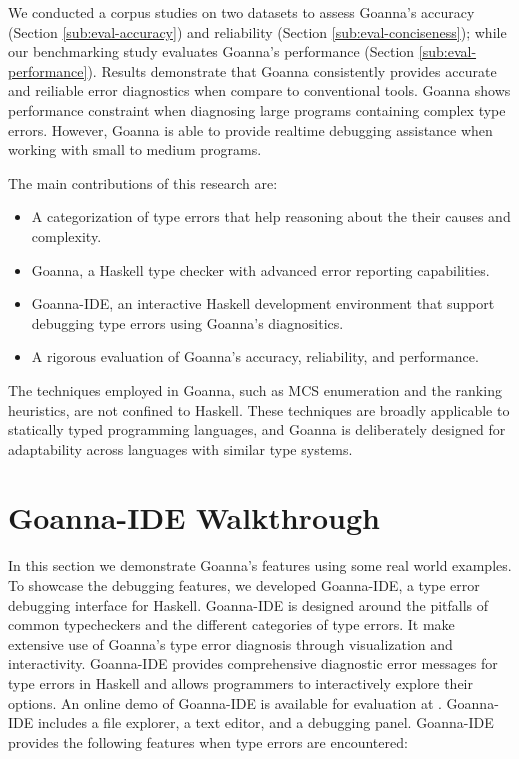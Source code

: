 \documentclass[pdflatex,sn-mathphys-num]{sn-jnl}%
\begin{document}
We conducted a corpus studies on two datasets to assess Goanna's accuracy (Section \ref{sub:eval-accuracy}) and reliability (Section \ref{sub:eval-conciseness}); while our benchmarking study evaluates Goanna's performance (Section \ref{sub:eval-performance}). Results demonstrate that Goanna consistently provides accurate and reiliable error diagnostics when compare to conventional tools. Goanna shows performance constraint when diagnosing large programs containing complex type errors. However, Goanna is able to provide realtime debugging assistance when working with small to medium programs.

The main contributions of this research are:
\begin{itemize}
    \item A categorization of type errors that help reasoning about the their causes and complexity.
    \item Goanna, a Haskell type checker with advanced error reporting capabilities.
    \item Goanna-IDE, an interactive Haskell development environment that support debugging type errors using Goanna's diagnositics.
    \item A rigorous evaluation of Goanna's accuracy, reliability, and performance.
\end{itemize}

The techniques employed in Goanna, such as MCS enumeration and the ranking heuristics, are not confined to Haskell. These techniques are broadly applicable to statically typed programming languages, and Goanna is deliberately designed for adaptability across languages with similar type systems.

\section{Goanna-IDE Walkthrough} \label{walkthrough}
In this section we  demonstrate Goanna's features using some real world examples. To showcase the debugging features,  we developed Goanna-IDE, a type error debugging interface for Haskell. Goanna-IDE is designed around the pitfalls of common typecheckers and the different categories of type errors. It make extensive use of Goanna's type error diagnosis through visualization and interactivity. Goanna-IDE provides comprehensive diagnostic error messages for type errors in Haskell and allows programmers to interactively explore their options. An online demo of Goanna-IDE is available for evaluation at \cite{Fu2023-bo}. Goanna-IDE includes a file explorer, a text editor, and a debugging panel. Goanna-IDE provides the following features when type errors are encountered:
\end{document}
